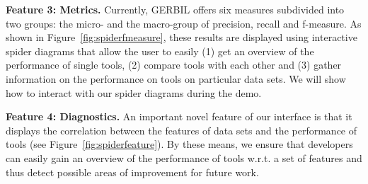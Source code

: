 \textbf{Feature 3: Metrics.}
Currently, GERBIL offers six measures subdivided into two groups: the micro- and the macro-group of precision, recall and f-measure. As shown in Figure~\ref{fig:spiderfmeasure}, these results are displayed using interactive spider diagrams that allow the user to easily (1) get an overview of the performance of single tools, (2) compare tools with each other and (3) gather information on the performance on tools on particular data sets. We will show how to interact with our spider diagrams during the demo.

\textbf{Feature 4: Diagnostics.}
An important novel feature of our interface is that it displays the correlation between the features of data sets and the performance of tools (see Figure~\ref{fig:spiderfeature}). By these means, we ensure that developers can easily gain an overview of the performance of tools w.r.t. a set of features and thus detect possible areas of improvement for future work. 

